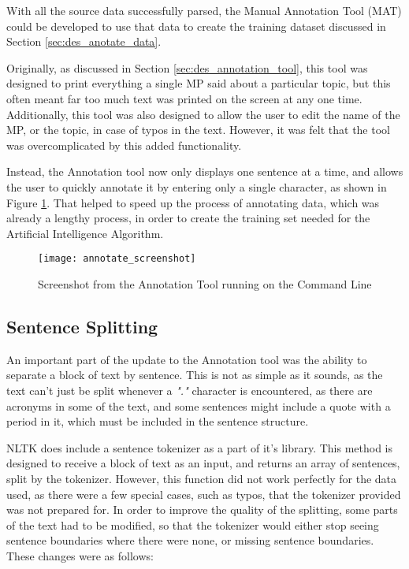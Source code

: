 With all the source data successfully parsed, the Manual Annotation Tool (MAT) could be developed to use that data to create the training dataset discussed in Section \ref{sec:des_anotate_data}.

Originally, as discussed in Section \ref{sec:des_annotation_tool}, this tool was designed to print everything a single MP said about a particular topic, but this often meant far too much text was printed on the screen at any one time. Additionally, this tool was also designed to allow the user to edit the name of the MP, or the topic, in case of typos in the text. However, it was felt that the tool was overcomplicated by this added functionality.

Instead, the Annotation tool now only displays one sentence at a time, and allows the user to quickly annotate it by entering only a single character, as shown in Figure \ref{fig:annotate_screenshot}. That helped to speed up the process of annotating data, which was already a lengthy process, in order to create the training set needed for the Artificial Intelligence Algorithm.

\begin{figure}[ht]
\texttt{[image: annotate\_screenshot]}
\caption{Screenshot from the Annotation Tool running on the Command Line}
\label{fig:annotate_screenshot}
\end{figure}

\subsection{Sentence Splitting}
\label{sec:imp_sentence_split}
An important part of the update to the Annotation tool was the ability to separate a block of text by sentence. This is not as simple as it sounds, as the text can't just be split whenever a \emph{"."} character is encountered, as there are acronyms in some of the text, and some sentences might include a quote with a period in it, which must be included in the sentence structure.

NLTK does include a sentence tokenizer as a part of it's library. This method is designed to receive a block of text as an input, and returns an array of sentences, split by the tokenizer. However, this function did not work perfectly for the data used, as there were a few special cases, such as typos, that the tokenizer provided was not prepared for. In order to improve the quality of the splitting, some parts of the text had to be modified, so that the tokenizer would either stop seeing sentence boundaries where there were none, or missing sentence boundaries. These changes were as follows:

